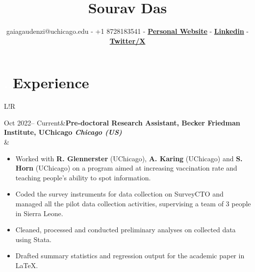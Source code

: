\documentclass[10pt]{article}
\title{\bfseries\Huge Sourav Das}
\author{gaiagaudenzi@uchicago.edu - +1 8728183541 - 
{\textcolor{bluelink}{\bf \href{https://gaiagaudenzi-lab.github.io/}{Personal Website}}} - 
{\textcolor{bluelink}{\bf \href{https://www.linkedin.com/in/gaiagaudenzi/}{Linkedin}}} - 
{\textcolor{bluelink}{\bf \href{https://twitter.com/GaudenziGaia}{Twitter/X}}}}
\date{} %
\newcommand\VRule{\color{lightgray}\vrule width 0.5pt}
\begin{document}
\maketitle

\vspace{-3pc}
\section*{\textcolor{white}{..}Experience}
\vspace{-0.5pc}
\begin{tabular}{L!{\VRule}R}

\small{Oct 2022-- Current}&{\bf Pre-doctoral Research Assistant, Becker Friedman Institute, UChicago \textit{Chicago (US)}}\\
&{\vspace{-0.5pc}
\begin{itemize}[leftmargin=1em,noitemsep,topsep=-2pt]
\item Worked with \textbf{R. Glennerster} (UChicago), \textbf{A. Karing} (UChicago) and \textbf{S. Horn} (UChicago) on a program aimed at increasing vaccination rate and teaching people's ability to spot information.
\item Coded the survey instruments for data collection on SurveyCTO and managed all the pilot data collection activities, supervising a team of 3 people in Sierra Leone.
\item Cleaned, processed and conducted preliminary analyses on collected data using Stata.
\item Drafted summary statistics and regression output for the academic paper in LaTeX.
\end{itemize}
}\\
\vspace{-1.3pc}


\end{tabular}
\end{document}
